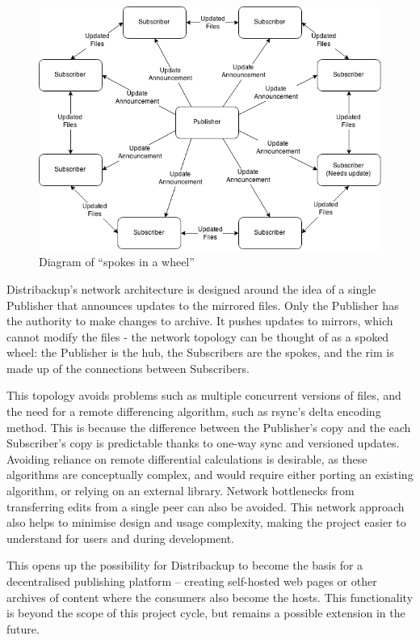 \documentclass[12pt,a4paper,]{adreport}
\begin{document}
\begin{figure}[h!]
\centering
\includegraphics{spokePic.png}
\caption{Diagram of ``spokes in a wheel''}
\end{figure}

Distribackup's network architecture is designed around the idea of a
single Publisher that announces updates to the mirrored files. Only the
Publisher has the authority to make changes to archive. It pushes
updates to mirrors, which cannot modify the files - the network topology
can be thought of as a spoked wheel: the Publisher is the hub, the
Subscribers are the spokes, and the rim is made up of the connections
between Subscribers.

This topology avoids problems such as multiple concurrent versions of
files, and the need for a remote differencing algorithm, such as rsync's
delta encoding method. This is because the difference between the
Publisher's copy and the each Subscriber's copy is predictable thanks to
one-way sync and versioned updates. Avoiding reliance on remote
differential calculations is desirable, as these algorithms are
conceptually complex, and would require either porting an existing
algorithm, or relying on an external library. Network bottlenecks from
transferring edits from a single peer can also be avoided. This network
approach also helps to minimise design and usage complexity, making the
project easier to understand for users and during development.

This opens up the possibility for Distribackup to become the basis for a
decentralised publishing platform -- creating self-hosted web pages or
other archives of content where the consumers also become the hosts.
This functionality is beyond the scope of this project cycle, but
remains a possible extension in the future.
\end{document}
